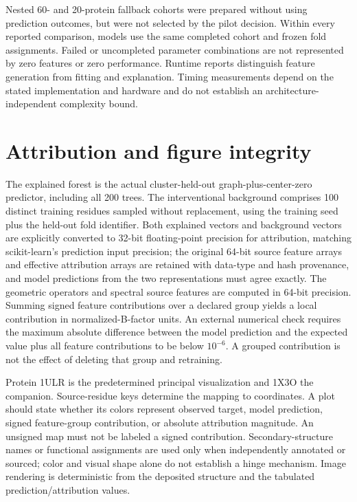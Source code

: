 \documentclass[10pt]{article}
\begin{document}
Nested 60- and 20-protein fallback cohorts were prepared without using prediction outcomes, but were not selected by the pilot decision. Within every reported comparison, models use the same completed cohort and frozen fold assignments. Failed or uncompleted parameter combinations are not represented by zero features or zero performance. Runtime reports distinguish feature generation from fitting and explanation. Timing measurements depend on the stated implementation and hardware and do not establish an architecture-independent complexity bound.

\section{Attribution and figure integrity}
The explained forest is the actual cluster-held-out graph-plus-center-zero predictor, including all 200 trees. The interventional background comprises 100 distinct training residues sampled without replacement, using the training seed plus the held-out fold identifier. Both explained vectors and background vectors are explicitly converted to 32-bit floating-point precision for attribution, matching scikit-learn's prediction input precision; the original 64-bit source feature arrays and effective attribution arrays are retained with data-type and hash provenance, and model predictions from the two representations must agree exactly. The geometric operators and spectral source features are computed in 64-bit precision. Summing signed feature contributions over a declared group yields a local contribution in normalized-B-factor units. An external numerical check requires the maximum absolute difference between the model prediction and the expected value plus all feature contributions to be below $10^{-6}$. A grouped contribution is not the effect of deleting that group and retraining.

Protein 1ULR is the predetermined principal visualization and 1X3O the companion. Source-residue keys determine the mapping to coordinates. A plot should state whether its colors represent observed target, model prediction, signed feature-group contribution, or absolute attribution magnitude. An unsigned map must not be labeled a signed contribution. Secondary-structure names or functional assignments are used only when independently annotated or sourced; color and visual shape alone do not establish a hinge mechanism. Image rendering is deterministic from the deposited structure and the tabulated prediction/attribution values.
\end{document}
